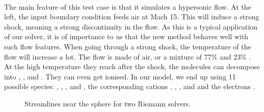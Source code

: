         \paragraph{}
        The main feature of this test case is that it simulates a hypersonic flow.
        At the left, the input boundary condition feeds air at Mach 15.
        This will induce a strong shock, meaning a strong discontinuity in the flow.
        As this is a typical application of our solver, it is of importance to us that the new method behaves well with such flow features.
        When going through a strong shock, the temperature of the flow will increase a lot.
        The flow is made of air, or a mixture of 77\%  and 23\% .
        At the high temperature they reach after the shock, the molecules can decompose into , , and .
        They can even get ionised.
        In our model, we end up using 11 possible species: , , ,  and , the corresponding cations , , ,  and  and the electrons .

        \begin{figure}
          \centering
          \caption{ Streamlines near the sphere for two Riemann solvers.}
          \label{fig:sphere_carbuncle}
        \end{figure}

